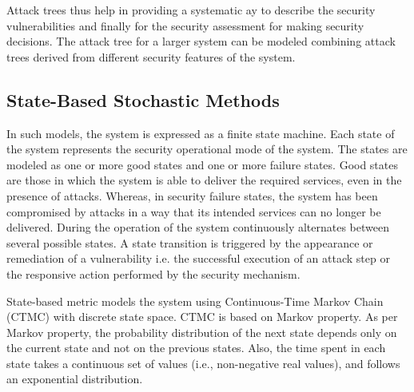 \documentclass[pdftex,english,oribibl]{llncs}
\begin{document}
Attack trees thus help in providing a systematic ay to describe the security vulnerabilities and finally for the security assessment for making security decisions. The attack tree for a larger system can be modeled combining attack trees derived from different security features of the system.  

\subsection{State-Based Stochastic Methods}
In such models, the system is expressed as a finite state machine.  Each state of the system represents the security operational mode of the system. The states are modeled as one or more good states and one or more failure states. Good states are those in which the system is able to deliver the required services, even in the presence of attacks. Whereas, in security failure states, the system has been compromised by attacks in a way that its intended services can no longer be delivered. During the operation of the system continuously alternates between several possible states. A state transition is triggered by the appearance or remediation of a vulnerability i.e. the successful execution of an attack step or the responsive action performed by the security mechanism.

State-based metric models the system using Continuous-Time Markov Chain (CTMC) with discrete state space. CTMC is based on Markov property. As per Markov property, the probability distribution of the next state depends only on the current state and not on the previous states. Also, the time spent in each state takes a continuous set of values (i.e., non-negative real values), and follows an exponential distribution.
\end{document}
